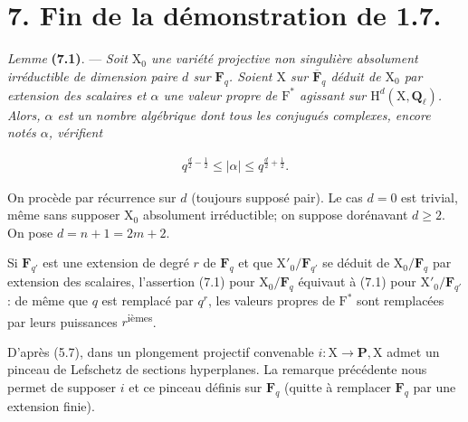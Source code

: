 \documentclass[10pt,leqno]{article}
\begin{document}
\section*{7. Fin de la démonstration de 1.7.}

\noindent \emph{Lemme} \textbf{(7.1)}. — {\itshape Soit \(\mathrm{X}_{0}\) une variété projective non singulière absolument irréductible de dimension \textup{paire} \(d\) sur \(\mathbf{F}_{q}\). Soient \(\mathrm{X}\) sur \(\overline{\mathbf{F}}_{q}\) déduit de \(\mathrm{X}_{0}\) par extension des scalaires et \(\alpha \) une valeur propre de \(\mathrm{F}^{*}\) agissant sur \(\mathrm{H}^{d}(\mathrm{X},\mathbf{Q}_{\ell })\). Alors, \(\alpha \) est un nombre algébrique dont tous les conjugués complexes, encore notés \(\alpha \), vérifient}\par

\begin{equation*}\begin{gathered}q^{\frac{d}{2}- \frac{1}{2}} \leq  |\alpha | \leq  q^{\frac{d}{2}+\frac{1}{2}}.\end{gathered}\tag{7.1.1}\end{equation*}

\noindent On procède par récurrence sur \(d\) (toujours supposé pair). Le cas \(d=0\) est trivial, même sans supposer \(\mathrm{X}_{0}\) absolument irréductible; on suppose dorénavant \(d\geq 2\). On pose \(d=n+1=2m+2\).\par

\clearpage

\label{physical-28}\setcounter{page}{299}

\noindent Si \(\mathbf{F}_{q'}\) est une extension de degré \(r\) de \(\mathbf{F}_{q}\) et que \(\mathrm{X}'_{0}/\mathbf{F}_{q'}\) se déduit de \(\mathrm{X}_{0}/\mathbf{F}_{q}\) par extension des scalaires, l’assertion (7.1) pour \(\mathrm{X}_{0}/\mathbf{F}_{q}\) équivaut à (7.1) pour \(\mathrm{X}'_{0}/\mathbf{F}_{q'}\) : de même que \(q\) est remplacé par \(q^{r}\), les valeurs propres de \(\mathrm{F}^{*}\) sont remplacées par leurs puissances \(r\)\textsuperscript{ièmes}.\par

\noindent D’après (5.7), dans un plongement projectif convenable \(i:\mathrm{X}\longrightarrow \mathbf{P}, \mathrm{X}\) admet un pinceau de Lefschetz de sections hyperplanes. La remarque précédente nous permet de supposer \(i\) et ce pinceau définis sur \(\mathbf{F}_{q}\) (quitte à remplacer \(\mathbf{F}_{q}\) par une extension finie).\par
\end{document}
